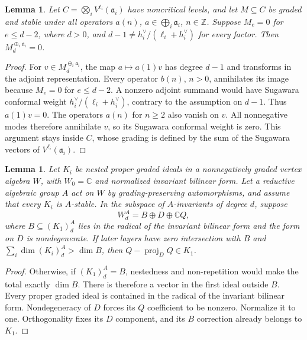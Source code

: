 \documentclass[11pt,a4paper]{amsart}
\numberwithin{equation}{section}
\newtheorem{lemma}[theorem]{Lemma}
\theoremstyle{definition}
\theoremstyle{remark}
\newcommand{\C}{\mathbb C}
\newcommand{\Z}{\mathbb Z}
\begin{document}
\begin{lemma}\label{v3:no-repeat}
Let $C=\bigotimes_i V^{\ell_i}(\mathfrak a_i)$ have noncritical
levels, and let $M\subseteq C$ be graded and stable under all operators $a(n)$, $a\in\bigoplus_i\mathfrak a_i$,
$n\in\Z$. Suppose $M_e=0$ for $e\le d-2$, where $d>0$, and
$d-1\ne h_i^\vee/(\ell_i+h_i^\vee)$ for every factor.
Then $M_d^{\oplus_i\mathfrak a_i}=0$.
\end{lemma}
\begin{proof}
For $v\in M_d^{\oplus_i\mathfrak a_i}$, the map
$a\mapsto a(1)v$ has degree $d-1$ and transforms in the adjoint
representation. Every operator $b(n)$, $n>0$, annihilates its image
because $M_e=0$ for $e\le d-2$. A nonzero adjoint summand would have
Sugawara conformal weight $h_i^\vee/(\ell_i+h_i^\vee)$, contrary to
the assumption on $d-1$. Thus $a(1)v=0$. The operators $a(n)$ for
$n\ge2$ also vanish on $v$. All nonnegative modes therefore
annihilate $v$, so its Sugawara conformal weight is zero. This argument stays inside $C$,
whose grading is defined by the sum of the Sugawara vectors of
$V^{\ell_i}(\mathfrak a_i)$.
\end{proof}

\begin{lemma}
\label{v3:gram-projection}
Let $K_i$ be nested proper graded ideals in a nonnegatively graded
vertex algebra $W$, with $W_0=\C$ and normalized invariant bilinear
form. Let a reductive algebraic group $A$ act on $W$ by
grading-preserving automorphisms, and assume that every $K_i$ is
$A$-stable. In the subspace of $A$-invariants of degree $d$, suppose
$$
 W_d^A=B\oplus D\oplus\C Q,
$$
where $B\subseteq(K_1)_d^A$ lies in the radical of the invariant
bilinear form and the form on $D$ is
nondegenerate. If later layers have zero intersection with $B$ and
$\sum_i\dim(K_i)_d^A>\dim B$, then
$Q-\operatorname{proj}_D Q\in K_1$.
\end{lemma}
\begin{proof}
Otherwise, if $(K_1)_d^A=B$, nestedness and non-repetition would make
the total exactly $\dim B$. There is therefore a vector in the first ideal
outside $B$. Every proper graded ideal is contained in the radical
of the invariant bilinear form. Nondegeneracy of
$D$ forces its $Q$ coefficient to be nonzero. Normalize it to one.
Orthogonality fixes its $D$ component, and its $B$ correction already
belongs to $K_1$.
\end{proof}
\end{document}
